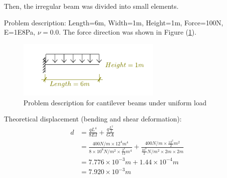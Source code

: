 \documentclass[fleqn,11pt,letter]{article}
\begin{document}
\newpage
Then, the irregular beam was divided into small elements. 


Problem description: Length=6m, Width=1m, Height=1m, Force=100N, E=1E8Pa, $\nu=0.0$. The force direction was shown in Figure (\ref{fig Problem description for cantilever beams under uniform pressure}). 

\begin{figure}[H]
  \centering
  \includegraphics[width=7cm]{../Figure_files/8NodeBrick/cantilever_6_uniform_load.pdf}
  \caption{Problem description for cantilever beams under uniform load  }
  \label{fig Problem description for cantilever beams under uniform pressure}
\end{figure}


Theoretical displacement (bending and shear deformation):
\begin{equation}
  \begin{aligned}
  d &=\frac{qL^4}{8EI} + \frac{q \frac{L^2}{2}}{GA} \\ 
    &= \frac{400 N/m \times 12^4 m^4}{8\times 10^8 N/m^2 \times \frac{2^4}{12} m^4} 
       + \frac{400 N/m \times \frac{12^2}{2} m^2} {\frac{10^8}{2} N/m^2 \times 2m\times 2m} \\ 
    &=7.776\times 10^{-3} m  +1.44\times 10^{-4} m \\
    &=7.920\times 10^{-3} m
   \end{aligned}
\end{equation}
\end{document}
